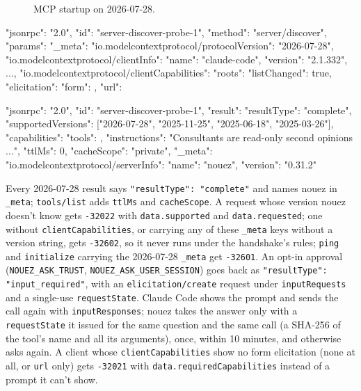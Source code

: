 \documentclass[10pt,a4paper]{article}
\newcommand{\lifelines}[2]{%
  \foreach \x/\name/\col in {#1} {%
    \node[actor, draw=\col, text=\col] at (\x,0) {\name};
    \draw[lifeline] (\x,-0.4) -- (\x,-#2);
  }}
\newcommand{\msg}[4]{\draw[call] (#2,-#1) -- node[above=1pt,lbl]{#4} (#3,-#1);}
\newcommand{\ret}[4]{\draw[reply] (#2,-#1) -- node[above=1pt,lbl]{#4} (#3,-#1);}
\newcommand{\side}[3]{\node[note, anchor=west] at (#2+0.15,-#1) {#3};}
\newcommand{\code}[1]{\texttt{#1}}
\begin{document}
\begin{figure}[H]
\centering
{}
\caption{MCP startup on 2026-07-28.}
\end{figure}

\begin{wire}
{"jsonrpc": "2.0", "id": "server-discover-probe-1", "method": "server/discover", "params": {"_meta": {
  "io.modelcontextprotocol/protocolVersion": "2026-07-28",
  "io.modelcontextprotocol/clientInfo": {"name": "claude-code", "version": "2.1.332", ...},
  "io.modelcontextprotocol/clientCapabilities": {"roots": {"listChanged": true},
    "elicitation": {"form": {}, "url": {}}}}}}
\end{wire}
\begin{wire}
{"jsonrpc": "2.0", "id": "server-discover-probe-1", "result": {"resultType": "complete",
  "supportedVersions": ["2026-07-28", "2025-11-25", "2025-06-18", "2025-03-26"],
  "capabilities": {"tools": {}}, "instructions": "Consultants are read-only second opinions ...",
  "ttlMs": 0, "cacheScope": "private",
  "_meta": {"io.modelcontextprotocol/serverInfo": {"name": "nouez", "version": "0.31.2"}}}}
\end{wire}

Every 2026-07-28 result says \code{"resultType": "complete"} and names nouez in \code{\_meta};
\code{tools/list} adds \code{ttlMs} and \code{cacheScope}. A request whose version nouez doesn't
know gets \code{-32022} with \code{data.supported} and \code{data.requested}; one without
\code{clientCapabilities}, or carrying any of these \code{\_meta} keys without a version string,
gets \code{-32602}, so it never runs under the handshake's rules; \code{ping} and
\code{initialize} carrying the 2026-07-28 \code{\_meta} get \code{-32601}. An opt-in approval
(\code{NOUEZ\_ASK\_TRUST}, \code{NOUEZ\_ASK\_USER\_SESSION}) goes back as
\code{"resultType": "input\_required"}, with an \code{elicitation/create} request under
\code{inputRequests} and a single-use \code{requestState}. Claude Code shows the prompt and sends
the call again with \code{inputResponses}; nouez takes the answer only with a
\code{requestState} it issued for the same question and the same call (a SHA-256 of the tool's
name and all its arguments), once, within 10 minutes, and otherwise asks again. A client whose
\code{clientCapabilities} show no form elicitation (none at all, or \code{url} only) gets
\code{-32021} with \code{data.requiredCapabilities} instead of a prompt it can't show.
\end{document}

